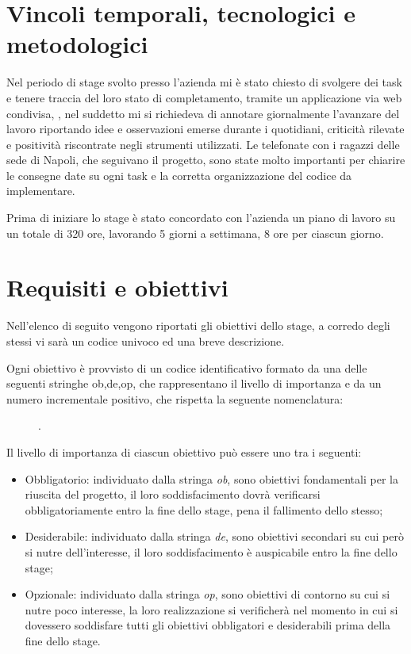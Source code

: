 \section{Vincoli temporali, tecnologici e metodologici}
Nel periodo di stage svolto presso l'azienda mi è stato chiesto di svolgere dei task e tenere traccia del loro stato di completamento, tramite un applicazione via web condivisa, , nel suddetto mi si richiedeva di annotare giornalmente l'avanzare del lavoro riportando idee e osservazioni emerse durante i  quotidiani, criticità rilevate e positività riscontrate negli strumenti utilizzati.
Le telefonate con i ragazzi delle sede di Napoli, che seguivano il progetto, sono state molto importanti per chiarire le consegne date su ogni task e la corretta organizzazione del codice da implementare.

Prima di iniziare lo stage è stato concordato con l'azienda un piano di lavoro su un totale di 320 ore, lavorando 5 giorni a settimana, 8 ore per ciascun giorno. 

\section{Requisiti e obiettivi}
Nell'elenco di seguito vengono riportati gli obiettivi dello stage, a corredo degli stessi vi sarà un codice univoco ed una breve descrizione.

Ogni obiettivo è provvisto di un codice identificativo formato da una delle seguenti stringhe ob,de,op, che rappresentano il livello di importanza e da un numero incrementale positivo, che rispetta la seguente nomenclatura: 
\begin{figure}[htp]
	\centering
	[importanza][identificativo].
\end{figure}

Il livello di importanza di ciascun obiettivo può essere uno tra i seguenti:
\begin{itemize}
	\item Obbligatorio: individuato dalla stringa \textit{ob}, sono obiettivi fondamentali per la riuscita del progetto, il loro soddisfacimento dovrà verificarsi obbligatoriamente entro la fine dello stage, pena il fallimento dello stesso;
	\item Desiderabile: individuato dalla stringa \textit{de}, sono obiettivi secondari su cui però si nutre dell'interesse, il loro soddisfacimento è auspicabile entro la fine dello stage;
	\item Opzionale: individuato dalla stringa \textit{op}, sono obiettivi di contorno su cui si nutre poco interesse, la loro realizzazione si verificherà nel momento in cui si dovessero soddisfare tutti gli obiettivi obbligatori e desiderabili prima della fine dello stage.
\end{itemize}


